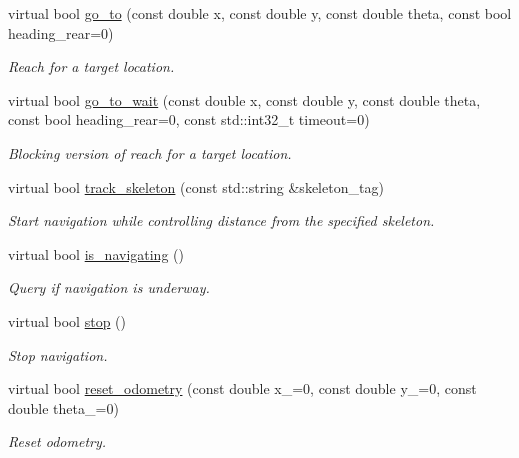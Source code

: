 \begin{DoxyCompactItemize}
\item 
virtual bool \mbox{\hyperlink{classnavController__IDL_aa2b9b90e9d2ef2fd8d557e8c99a8ca7d}{go\+\_\+to}} (const double x, const double y, const double theta, const bool heading\+\_\+rear=0)
\begin{DoxyCompactList}\small\item\em Reach for a target location. \end{DoxyCompactList}\item 
virtual bool \mbox{\hyperlink{classnavController__IDL_aec1be2f92b59c4669dff3766b519a971}{go\+\_\+to\+\_\+wait}} (const double x, const double y, const double theta, const bool heading\+\_\+rear=0, const std\+::int32\+\_\+t timeout=0)
\begin{DoxyCompactList}\small\item\em Blocking version of reach for a target location. \end{DoxyCompactList}\item 
virtual bool \mbox{\hyperlink{classnavController__IDL_a09b17abbbfc5129f86de9f9bb2c5e230}{track\+\_\+skeleton}} (const std\+::string \&skeleton\+\_\+tag)
\begin{DoxyCompactList}\small\item\em Start navigation while controlling distance from the specified skeleton. \end{DoxyCompactList}\item 
virtual bool \mbox{\hyperlink{classnavController__IDL_a2c935f193a150936dfc2cc7482744dbb}{is\+\_\+navigating}} ()
\begin{DoxyCompactList}\small\item\em Query if navigation is underway. \end{DoxyCompactList}\item 
virtual bool \mbox{\hyperlink{classnavController__IDL_a813f076a8130f03c4930ed7659b37e7e}{stop}} ()
\begin{DoxyCompactList}\small\item\em Stop navigation. \end{DoxyCompactList}\item 
virtual bool \mbox{\hyperlink{classnavController__IDL_a3b1f0d0434d00620c82cc844e88f74d9}{reset\+\_\+odometry}} (const double x\+\_=0, const double y\+\_=0, const double theta\+\_=0)
\begin{DoxyCompactList}\small\item\em Reset odometry. \end{DoxyCompactList}\item 

\end{DoxyCompactItemize}

